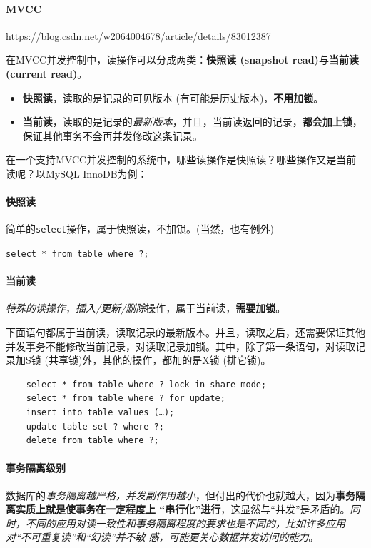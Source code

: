 \documentclass[UTF8,a4paper,12pt]{ctexbook}
\begin{document}
			\paragraph{MVCC}
				\url{https://blog.csdn.net/w2064004678/article/details/83012387}
				
			在MVCC并发控制中，读操作可以分成两类：\textbf{快照读 (snapshot read)}与\textbf{当前读 (current read)}。
			\begin{itemize}
				\item \textbf{快照读}，读取的是记录的可见版本 (有可能是历史版本)，\textbf{不用加锁}。
				\item \textbf{当前读}，读取的是记录的\textit{最新版本}，并且，当前读返回的记录，\textbf{都会加上锁}，保证其他事务不会再并发修改这条记录。
			\end{itemize}
			
			
			在一个支持MVCC并发控制的系统中，哪些读操作是快照读？哪些操作又是当前读呢？以MySQL InnoDB为例：
			
			\paragraph{快照读}
				简单的\verb|select|操作，属于快照读，不加锁。(当然，也有例外)
				
				\verb|select * from table where ?; |
				
			\paragraph{当前读}
				\textit{特殊的读操作}，\textit{插入/更新/删除}操作，属于当前读，\textbf{需要加锁}。
				
				下面语句都属于当前读，读取记录的最新版本。并且，读取之后，还需要保证其他并发事务不能修改当前记录，对读取记录加锁。其中，除了第一条语句，对读取记录加S锁 (共享锁)外，其他的操作，都加的是X锁 (排它锁)。
				
				\begin{lstlisting}
	select * from table where ? lock in share mode;
	select * from table where ? for update;
	insert into table values (…);
	update table set ? where ?;
	delete from table where ?;			
				\end{lstlisting}
				
			
			\paragraph{事务隔离级别}
				
				数据库的\textit{事务隔离越严格，并发副作用越小}，但付出的代价也就越大，因为\textbf{事务隔离实质上就是使事务在一定程度上 “串行化”进行}，这显然与“并发”是矛盾的。\textit{同时，不同的应用对读一致性和事务隔离程度的要求也是不同的，比如许多应用对“不可重复读”和“幻读”并不敏 感，可能更关心数据并发访问的能力}。
				
\end{document}
